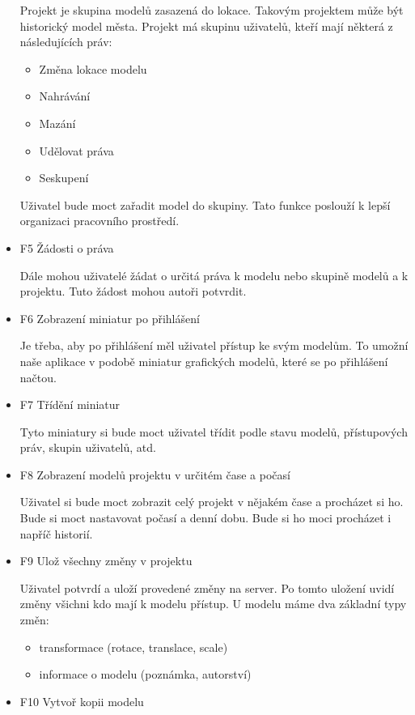 \documentclass[thesis=B,czech]{FITthesis}[2012/06/26]
\begin{document}
\begin{itemize}
                Projekt je skupina modelů zasazená do lokace. Takovým projektem může být historický model města. Projekt má skupinu uživatelů, kteří mají některá z následujících práv:
                \begin{itemize}
                    \item Změna lokace modelu
                    \item Nahrávání
                    \item Mazání
                    \item Udělovat práva
                    \item Seskupení
                \end{itemize}
                Uživatel bude moct zařadit model do skupiny. Tato funkce poslouží k lepší organizaci pracovního prostředí.
                \item F5 Žádosti o práva
                
                Dále mohou uživatelé žádat o určitá práva k modelu nebo skupině modelů a k projektu. Tuto žádost mohou autoři potvrdit.
                \item F6 Zobrazení miniatur po přihlášení
                
                Je třeba, aby po přihlášení měl uživatel přístup ke svým modelům. To umožní naše aplikace v podobě miniatur grafických modelů, které se po přihlášení načtou.
                \item F7 Třídění miniatur
                
                Tyto miniatury si bude moct uživatel třídit podle stavu modelů, přístupových práv, skupin uživatelů, atd.
                \item F8 Zobrazení modelů projektu v určitém čase a počasí
                
                Uživatel si bude moct zobrazit celý projekt v nějakém čase a procházet si ho. Bude si moct nastavovat počasí a denní dobu. Bude si ho moci procházet i napříč historií.
                \item F9 Ulož všechny změny v projektu
                
                Uživatel potvrdí a uloží provedené změny na server. Po tomto uložení uvidí změny všichni kdo mají k modelu přístup.
                U modelu máme dva základní typy změn:
                \begin{itemize}
                    \item transformace (rotace, translace, scale)
                    \item informace o modelu (poznámka, autorství)
                \end{itemize}
                \item F10 Vytvoř kopii modelu
                

\end{itemize}
\end{document}
